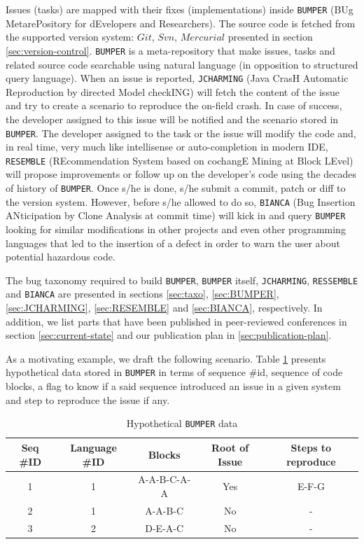 Issues (tasks) are  mapped with their fixes (implementations) inside {\tt BUMPER} (BUg MetarePository for dEvelopers and Researchers). The source code is fetched from the supported version system: $Git$, $Svn$, $Mercurial$ presented in section \ref{sec:version-control}.
{\tt BUMPER} is a meta-repository that make issues, tasks and related source code searchable using natural language  (in opposition to structured query language).
When an issue is reported, {\tt JCHARMING} (Java CrasH Automatic Reproduction by directed Model checkING) will fetch the content of the issue and try to create a scenario to reproduce the on-field crash. In case of success, the developer assigned to this issue will be notified and the scenario stored in {\tt BUMPER}.
The developer assigned to the task or the issue will modify the code and, in real time, very much like intellisense or auto-completion in modern IDE, {\tt RESEMBLE} (REcommendation System based on cochangE Mining at Block LEvel) will propose improvements or follow up on the developer's code using the decades of history of {\tt BUMPER}. Once s/he is done, s/he submit a commit, patch or diff to the version system.
However, before s/he allowed to do so, {\tt BIANCA} (Bug Insertion ANticipation by Clone Analysis at commit time) will kick in and query {\tt BUMPER} looking for similar modifications in other projects and even other programming languages that led to the insertion of a defect in order to warn the user about potential hazardous code.


The bug taxonomy required to build {\tt BUMPER}, {\tt BUMPER} itself, {\tt JCHARMING}, {\tt RESSEMBLE} and {\tt BIANCA} are presented in sections \ref{sec:taxo}, \ref{sec:BUMPER}, \ref{sec:JCHARMING}, \ref{sec:RESEMBLE} and \ref{sec:BIANCA}, respectively. In addition, we list parts that have been published in peer-reviewed conferences in section \ref{sec:current-state} and our publication plan in \ref{sec:publication-plan}.

As a motivating example, we draft the following scenario. Table \ref{tab:bumper-hypo} presents hypothetical data stored in {\tt BUMPER} in terms of sequence \#id, sequence of code blocks, a flag to know if a said sequence introduced an issue in a given system and step to reproduce the issue if any.

\begin{table}[h!]
\centering
\begin{tabular}{c|c|c|c|c}
Seq \#ID & Language \#ID & Blocks & Root of Issue & Steps to reproduce \\ \hline \hline
1        & 1             & A-A-B-C-A-A   & Yes  & E-F-G         \\
2        & 1             & A-A-B-C       & No   & -         \\
3        & 2             & D-E-A-C       & No &  - \\ \hline \hline
\end{tabular}
\caption{Hypothetical {\tt BUMPER} data}
\label{tab:bumper-hypo}
\end{table}

